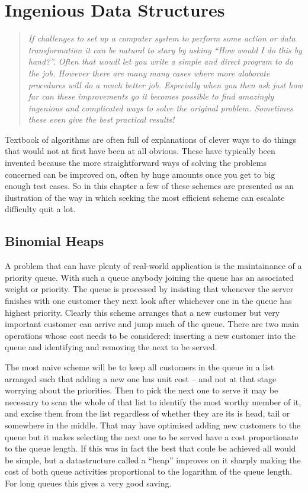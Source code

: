 \section{Ingenious Data Structures}
\begin{quotation}\textit{
If challenges to set up a computer system to perform some action or
data transformation it can be natural to stary by asking ``How would
I do this by hand?''. Often that woudl let you write a simple and direct
program to do the job. However there are many many cases where more
alaborate procedures will do a much better job. Especially when you then
ask just how far can these improvements go it becomes possible to
find amazingly ingenious and complicated ways to solve the original
problem. Sometimes these even give the best practical results!
}\end{quotation}
Textbook of algorithms are often full of explanations of clever ways
to do things that would not at first have been at all obvious. These
have typically been invented because the more straightforward ways
of solving the problems concerned can be improved on, often by
huge amounts once you get to big enough test cases. So in this
chapter a few of these schemes are presented as an ilustration of the
way in which seeking the most efficient scheme can escalate difficulty quit
a lot.

\subsection{Binomial Heaps}
A problem that can have plenty of real-world application is the
maintainance of a priority queue. With such a queue anybody
joining the queue has an associated weight or priority. The
queue is processed by insisting that whenever the server finishes
with one customer they next look after whichever one in the queue has
highest priority. Clearly this scheme arranges that a new customer but
very important customer can arrive and jump much of the queue. There are
two main operations whose cost needs to be considered: inserting
a new customer into the queue and identifying and removing the next
to be served.

The most naive scheme will be to keep all customers in the queue
in a list arranged such that adding a new one has unit cost -- and not
at that stage worrying about the priorities. Then to pick the next
one to serve it may be necessary to scan the whole of that list to
identify the most worthy member of it, and excise them from the
list regardless of whether they are its is head, tail or somewhere in the
middle. That may have optimised adding new customers to the queue
but it makes selecting the next one to be served have a cost proportionate
to the queue length. If this was in fact the best that coule be achieved
all would be simple, but a datastructure called a ``heap'' improves on
it sharply making the cost of both queue activities proportional to
the logarithm of the queue length. For long queues this gives a very
good saving.

